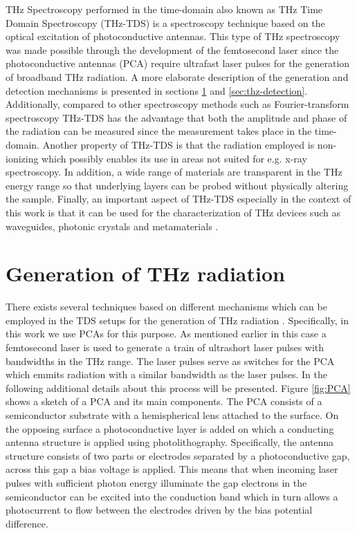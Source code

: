 THz Spectroscopy performed in the time-domain also known as THz Time Domain Spectroscopy (THz-TDS) is a spectroscopy technique based on the optical excitation of photoconductive antennas. This type of THz spectroscopy was made possible through the development of the femtosecond laser since the photoconductive antennas (PCA) require ultrafast laser pulses for the generation of broadband THz radiation. A more elaborate description of the generation and detection mechanisms is presented in sections \ref{sec:thz-generation} and \ref{sec:thz-detection}. Additionally, compared to other spectroscopy methods such as Fourier-transform spectroscopy THz-TDS has the advantage that both the amplitude and phase of the radiation can be measured since the measurement takes place in the time-domain. Another property of THz-TDS is that the radiation employed is non-ionizing which possibly enables its use in areas not suited for e.g. x-ray spectroscopy. In addition, a wide range of materials are transparent in the THz energy range so that underlying layers can be probed without physically altering the sample. Finally, an important aspect of THz-TDS especially in the context of this work is that it can be used for the characterization of THz devices such as waveguides, photonic crystals and metamaterials \cite{Horlick68, Jepsen2011}.

\section{Generation of THz radiation}
\label{sec:thz-generation}
There exists several techniques based on different mechanisms which can be employed in the TDS setups for the generation of THz radiation \cite{Jepsen2011}. Specifically, in this work we use PCAs for this purpose. As mentioned earlier in this case a femtosecond laser is used to generate a train of ultrashort laser pulses with bandwidths in the THz range. The laser pulses serve as switches for the PCA which emmits radiation with a similar bandwidth as the laser pulses. In the following additional details about this process will be presented.
Figure \ref{fig:PCA} shows a sketch of a PCA and its main components. The PCA consists of a semiconductor substrate with a hemispherical lens attached to the surface. On the opposing surface a photoconductive layer is added on which a conducting antenna structure is applied using photolithography. Specifically, the antenna structure consists of two parts or electrodes separated by a photoconductive gap, across this gap a bias voltage is applied. This means that when incoming laser pulses with sufficient photon energy illuminate the gap electrons in the semiconductor can be excited into the conduction band which in turn allows a photocurrent to flow between the electrodes driven by the bias potential difference. 

